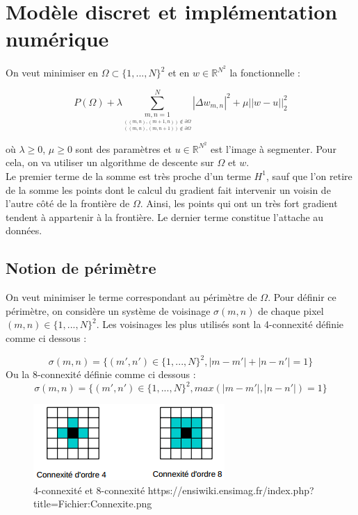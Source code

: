 \section{Modèle discret et implémentation numérique}

On veut minimiser en $\Omega \subset \{1,...,N\}^2$ et en $w \in \mathbb{R}^{N^2}$ la fonctionnelle : 

\[ P(\Omega) + \lambda \sum \limits_{\underset{((m,n), (m, n+1)) \notin \partial \Omega}{\underset{((m,n),(m+1, n)) \notin \partial \Omega}{m,n = 1}}}^{N} |\Delta w_{m,n}|^2 + \mu ||w - u ||_2^2 \]

où $\lambda \geq 0$, $\mu \geq 0$ sont des paramètres et $u \in \mathbb{R}^{N^2}$ est l'image à segmenter. Pour cela, on va utiliser un algorithme de descente sur $\Omega$ et $w$. \\

Le premier terme de la somme est très proche d'un terme $H^1$, sauf que l'on retire de la somme les points dont le calcul du gradient fait intervenir un voisin de l'autre côté de la frontière de $\Omega$. Ainsi, les points qui ont un très fort gradient tendent à appartenir à la frontière. Le dernier terme constitue l'attache au données. 

\subsection{Notion de périmètre}

On veut minimiser le terme correspondant au périmètre de $\Omega$. Pour définir ce périmètre, on considère un système de voisinage $\sigma(m,n)$ de chaque pixel $(m,n) \in \{1,...,N\}^2$. Les voisinages les plus utilisés sont la 4-connexité définie comme ci dessous :

\[ \sigma (m,n) = \{ (m',n') \in  \{1,...,N\}^2, |m - m' | + |n - n'| = 1 \}\]
Ou la 8-connexité définie comme ci dessous : 
\[ \sigma (m,n) = \{ (m',n') \in  \{1,...,N\}^2, max(|m - m' | , |n - n'| ) = 1 \}\]

\begin{figure}[H]
\centering
\includegraphics[scale=1]{images/Connexite.png}
\caption{4-connexité et 8-connexité \newline  https://ensiwiki.ensimag.fr/index.php?title=Fichier:Connexite.png}
\end{figure}

